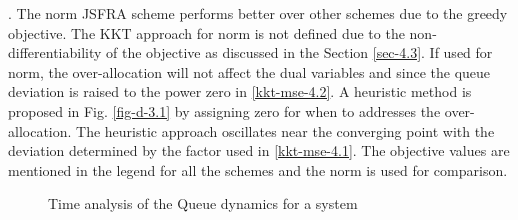 . The  norm \ac{JSFRA} scheme performs better over other schemes due to the greedy objective. The \ac{KKT} approach for  norm is not defined due to the non-differentiability of the objective as discussed in the Section \ref{sec-4.3}. If used for  norm, the over-allocation will not affect the dual variables  and  since the queue deviation is raised to the power zero in \eqref{kkt-mse-4.2}. A heuristic method is proposed in Fig. \ref{fig-d-3.1} by assigning zero for  when  to addresses the over-allocation. The heuristic approach oscillates near the converging point with the deviation determined by the factor \me{\rho} used in \eqref{kkt-mse-4.1}. The objective values are mentioned in the legend for all the schemes and the  norm is used for comparison.
\begin{figure*}
	\centering
	\hfill
	\caption{Time analysis of the Queue dynamics for a system }
	\label{fig-time-analysis}
\end{figure*}

